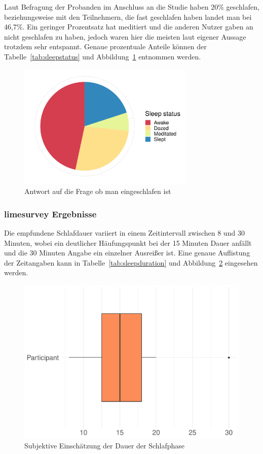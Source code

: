 Laut Befragung der Probanden im Anschluss an die Studie haben 20\% geschlafen, beziehungsweise mit den Teilnehmern, die fast geschlafen haben landet man bei 46,7\%. Ein geringer Prozentsatz hat meditiert und die anderen Nutzer gaben an nicht geschlafen zu haben, jedoch waren hier die meisten laut eigener Aussage trotzdem sehr entspannt. Genaue prozentuale Anteile können der Tabelle~\ref{tab:sleepstatus} und Abbildung~\ref{fig:slept} entnommen werden.

\begin{figure}[H]
	\centering
	\includegraphics[width=0.75\textwidth]{./_StudyResults/slept}
	\caption{Antwort auf die Frage ob man eingeschlafen ist}
	\label{fig:slept}
\end{figure}

\subsubsection{limesurvey Ergebnisse}
Die empfundene Schlafdauer variiert in einem Zeitintervall zwischen 8 und 30 Minuten, wobei ein deutlicher Häufungspunkt bei der 15 Minuten Dauer anfällt und die 30 Minuten Angabe ein einzelner Ausreißer ist. Eine genaue Auflistung der Zeitangaben kann in Tabelle~\ref{tab:sleepduration} und Abbildung~\ref{fig:subjectiveSleepDuration} eingesehen werden.

\begin{figure}[H]
	\centering
	\includegraphics[width=\textwidth]{./_StudyResults/subjectiveSleepDuration}
	\caption{Subjektive Einschätzung der Dauer der Schlafphase}
	\label{fig:subjectiveSleepDuration}
\end{figure}

